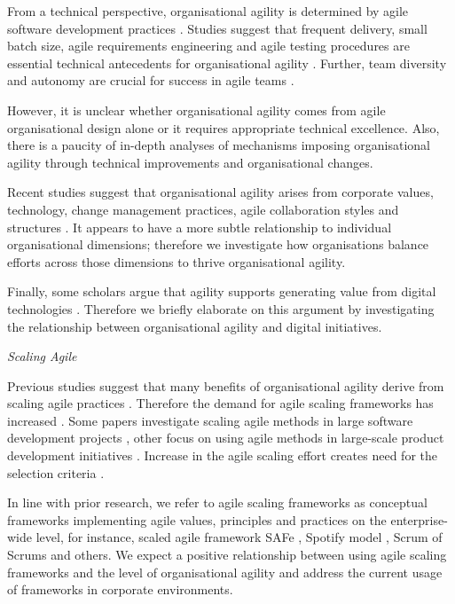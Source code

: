 \documentclass{article}
\begin{document}
From a technical perspective, organisational agility is determined by agile software development practices \cite{Beck2001, Martin2002}. Studies suggest that frequent delivery, small batch size, agile requirements engineering and agile testing procedures are essential technical antecedents for organisational agility \cite{Chow2008, deSouza2014}. Further, team diversity and autonomy are crucial for success in agile teams \cite{Lee2010, Lindsjorn2016}.

However, it is unclear whether organisational agility comes from agile organisational design alone or it requires appropriate technical excellence. Also, there is a paucity of in-depth analyses of mechanisms imposing organisational agility through technical improvements and organisational changes.

Recent studies suggest that organisational agility arises from corporate values, technology, change management practices, agile collaboration styles and structures \cite{wendler2012}. It appears to have a more subtle relationship to individual organisational dimensions; therefore we investigate how organisations balance efforts across those dimensions to thrive organisational agility.

Finally, some scholars argue that agility supports generating value from digital technologies \cite{kovynyov2019digital, ghezzi2020agile}. Therefore we briefly elaborate on this argument by investigating the relationship between organisational agility and digital initiatives.

\textit{Scaling Agile}


Previous studies suggest that many benefits of organisational agility derive from scaling agile practices \cite{Kalenda2018}. Therefore the demand for agile scaling frameworks has increased \cite{Rigby2016}. Some papers investigate scaling agile methods in large software development projects \cite{Alqudah2016}, other focus on using agile methods in large-scale product development initiatives \cite{Kettunen2008}. Increase in the agile scaling effort creates need for the selection criteria \cite{diebold2018scaling}.

In line with prior research, we refer to agile scaling frameworks as conceptual frameworks implementing agile values, principles and practices on the enterprise-wide level, for instance, scaled agile framework SAFe \cite{leffingwell2018safe}, Spotify model \cite{Kniberg2012}, Scrum of Scrums \cite{Sutherland2005} and others. We expect a positive relationship between using agile scaling frameworks and the level of organisational agility and address the current usage of frameworks in corporate environments.
\end{document}

